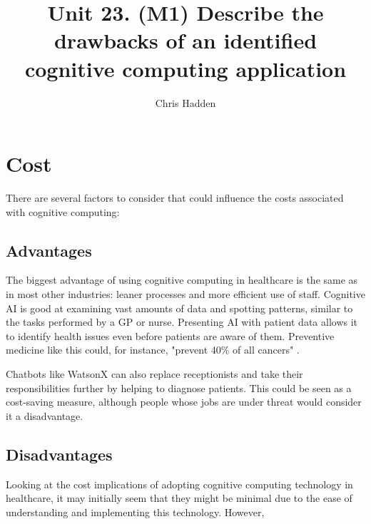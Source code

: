 \documentclass{article}
\title{Unit 23. (M1) Describe the drawbacks of an identified cognitive computing application}
\author{Chris Hadden}
\date{}
\begin{document}
\maketitle

\section{Cost}\label{cost}
There are several factors to consider that could influence the costs associated with cognitive computing:

\subsection{Advantages}
The biggest advantage of using cognitive computing in healthcare is the same as in most other industries: leaner processes and more efficient use of staff. Cognitive AI is good at examining vast amounts of data and spotting patterns, similar to the tasks performed by a GP or nurse. Presenting AI with patient data allows it to identify health issues even before patients are aware of them. Preventive medicine like this could, for instance, "prevent 40\% of all cancers" \cite{prevention}.

Chatbots like WatsonX can also replace receptionists and take their responsibilities further by helping to diagnose patients. This could be seen as a cost-saving measure, although people whose jobs are under threat would consider it a disadvantage.

\subsection{Disadvantages}
Looking at the cost implications of adopting cognitive computing technology in healthcare, it may initially seem that they might be minimal due to the ease of understanding and implementing this technology. However, 
\end{document}

